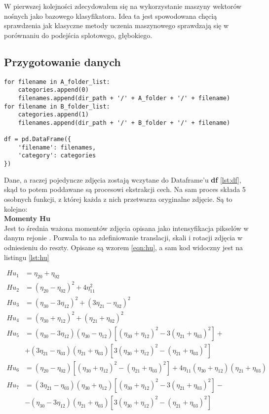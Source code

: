 W  pierwszej kolejności zdecydowałem się na wykorzystanie maszyny wektorów nośnych jako bazowego klasyfikatora. Idea ta jest spowodowana chęcią sprawdzenia jak klasyczne metody uczenia maszynowego sprawdzają się w porównaniu do podejścia splotowego, głębokiego.

\subsection{Przygotowanie danych}

\begin{lstlisting}[caption={Kod stworzenia ramki danych \textbf{df}}, label={lst:df}]
for filename in A_folder_list:
	categories.append(0)
	filenames.append(dir_path + '/' + A_folder + '/' + filename)
for filename in B_folder_list:
	categories.append(1)
	filenames.append(dir_path + '/' + B_folder + '/' + filename)

df = pd.DataFrame({
	'filename': filenames,
	'category': categories
})
\end{lstlisting}


Dane, a raczej pojedyncze zdjęcia zostają wczytane do Dataframe'u \textbf{df} \ref{lst:df}, skąd to potem poddawane są procesowi ekstrakcji cech. Na sam proces składa 5 osobnych funkcji, z której każda z nich przetwarza oryginalne zdjęcie. Są to kolejno:\\

\textbf{Momenty Hu} \\

Jest to  średnia ważona momentów zdjęcia opisana jako intensyfikacja pikselów w danym rejonie \cite{hu}. Pozwala to na zdefiniowanie translacji, skali i rotacji zdjęcia w odniesieniu do reszty. Opisane są wzorem \ref{eqn:hu}, a sam kod widoczny jest na listingu \ref{lst:hu}

\begin{equation}
	\begin{split}
		Hu_{1} &= \eta_{20} + \eta_{02} \\
		Hu_{2} &= (\eta_{20} - \eta_{02})^2 + 4\eta^2_{11} \\
		Hu_{3} &= (\eta_{30} - 3\eta_{12})^2 + (3\eta_{21} - \eta_{02})^2 \\
		Hu_{4} &= (\eta_{30} + \eta_{12})^2 + (\eta_{21} + \eta_{02})^2 \\
		Hu_{5} &= (\eta_{30} - 3\eta_{12})(\eta_{30} - \eta_{12})\left [ (\eta_{30} + \eta_{12})^2 - 3(\eta_{21} + \eta_{03})^2 \right ] +\\
		 &+ (3\eta_{21} - \eta_{03})(\eta_{21}+\eta_{03})\left [3(\eta_{30} + \eta_{12})^2-(\eta_{21} + \eta_{03})^2 \right ] \\
		 Hu_{6} &= (\eta_{20}-\eta_{02})\left [ (\eta_{30} + \eta_{12})^2 - (\eta_{21} + \eta_{03})^2\right ] +4\eta_{11}(\eta_{30}+\eta_{12})(\eta_{21} + \eta_{03}) \\
		 Hu_{7} &= (3\eta_{21} - \eta_{03})(\eta_{30}+\eta_{12})\left [(\eta_{30}+\eta_{12})^2-3(\eta_{21}+\eta_{03})^2 \right ] -\\
		  &- (\eta_{30}-3\eta_{12})(\eta_{21} + \eta_{03}) \left [3(\eta_{30}+\eta_{12})^2-(\eta_{21} + \eta_{03})^2 \right ]
	\end{split}
	\label{eqn:hu}
\end{equation}

